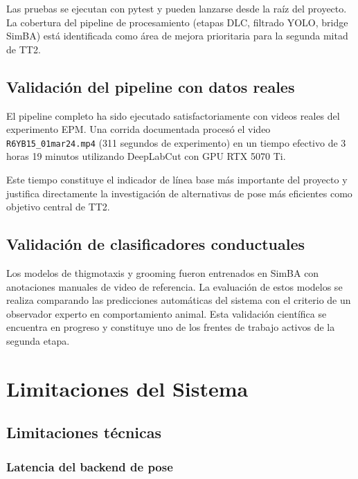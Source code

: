 \documentclass[12pt]{report}
\begin{document}
Las pruebas se ejecutan con pytest y pueden lanzarse desde la raíz del proyecto.
La cobertura del pipeline de procesamiento (etapas DLC, filtrado YOLO, bridge
SimBA) está identificada como área de mejora prioritaria para la segunda mitad
de TT2.

\section{Validación del pipeline con datos reales}

El pipeline completo ha sido ejecutado satisfactoriamente con videos reales
del experimento EPM. Una corrida documentada procesó el video
\texttt{R6YB15\_01mar24.mp4} (311 segundos de experimento) en un tiempo
efectivo de 3 horas 19 minutos utilizando DeepLabCut con GPU RTX 5070 Ti.

Este tiempo constituye el indicador de línea base más importante del proyecto
y justifica directamente la investigación de alternativas de pose más eficientes
como objetivo central de TT2.

\section{Validación de clasificadores conductuales}

Los modelos de thigmotaxis y grooming fueron entrenados en SimBA con anotaciones
manuales de video de referencia. La evaluación de estos modelos se realiza
comparando las predicciones automáticas del sistema con el criterio de un
observador experto en comportamiento animal. Esta validación científica se
encuentra en progreso y constituye uno de los frentes de trabajo activos de
la segunda etapa.

\chapter{Limitaciones del Sistema}

\section{Limitaciones técnicas}

\subsection{Latencia del backend de pose}
\end{document}
